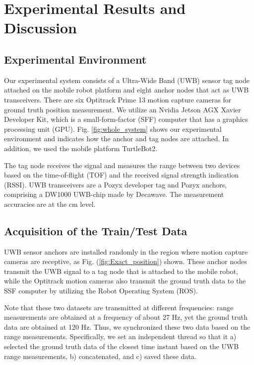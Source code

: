 \documentclass[letterpaper, 10 pt, conference]{ieeeconf}
\begin{document}
\section{Experimental Results and Discussion}
\subsection{Experimental Environment}

Our experimental system consists of a Ultra-Wide Band (UWB)  sensor tag node attached on the mobile robot platform and eight anchor nodes that act as UWB transceivers. There are six Optitrack Prime 13 motion capture cameras for ground truth position measurement. We utilize an Nvidia Jetson AGX Xavier Developer Kit\cite{xavier2018}, which is a small-form-factor (SFF) computer that has a graphics processing unit (GPU). Fig. \ref{fig:whole_system} shows our experimental environment and indicates how the anchor and tag nodes are attached. In addition, we used the mobile platform TurtleBot2\cite{turtlebot22013}.

The tag node receives the signal and measures the range between two devices based on the time-of-flight (TOF) and the received signal strength indication (RSSI). UWB transceivers are a Pozyx developer tag and Pozyx anchors\cite{pozyx2018}, comprising a DW1000 UWB-chip made by Decawave. The measurement accuracies are at the cm level.
 
\subsection{Acquisition of the Train/Test Data}

UWB sensor anchors are installed randomly in the region where motion capture cameras are receptive, as Fig. (\ref{fig:Exact_position}) shown. These anchor nodes transmit the UWB signal to a tag node that is attached to the mobile robot, while the Optitrack motion cameras also transmit the ground truth data to the SSF computer by utilizing the Robot Operating System (ROS).

Note that these two datasets are transmitted at different frequencies: range measurements are obtained at a frequency of about 27 Hz, yet the ground truth data are obtained at 120 Hz. Thus, we synchronized these two data based on the range measurements. Specifically, we set an independent thread so that it a) selected the ground truth data of the closest time instant based on the UWB range measurements, b) concatenated, and c) saved these data.
\end{document}
